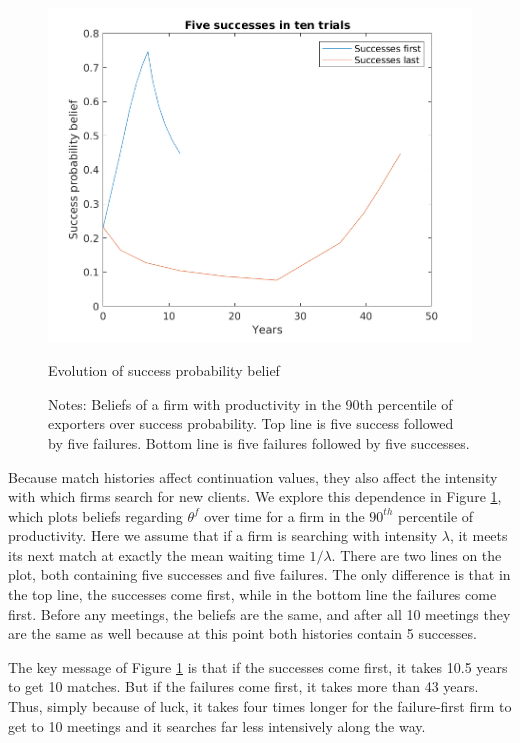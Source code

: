\documentclass[12pt]{article}
\begin{document}
\begin{figure}
    \centering
    \includegraphics[scale=0.5]{figures/success_beliefs}
    \caption{Evolution of success probability belief}
    \label{fig:success_beliefs}
    \caption*{\small{Notes: Beliefs of a firm with productivity in the 90th percentile of exporters over success probability.  Top line is five success followed by five failures.  Bottom line is five failures followed by five successes.}}
\end{figure}

Because match histories affect continuation values, they also affect the intensity
with which firms search for new clients. We explore this dependence in
Figure \ref{fig:success_beliefs}, which plots beliefs regarding $\theta ^{f}$
over time for a firm in the $90^{th}$ percentile of productivity. Here we assume
that if a firm is searching with intensity $\lambda $, it meets its next
match at exactly the mean waiting time $1/\lambda $. There are two lines on
the plot, both containing five successes and five failures. The only
difference is that in the top line, the successes come first, while in the
bottom line the failures come first. Before any meetings, the beliefs are
the same, and after all 10 meetings they are the same as well because at
this point both histories contain 5 successes.

The key message of Figure \ref{fig:success_beliefs} is that if the successes
come first, it takes 10.5 years to get 10 matches. But if the failures come
first, it takes more than 43 years. Thus, simply because of luck, it takes
four times longer for the failure-first firm to get to 10 meetings and it
searches far less intensively along the way.
\end{document}
